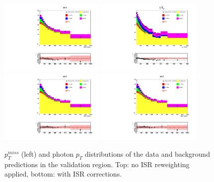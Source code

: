 \documentclass[thesis.tex]{subfiles}
\renewcommand\_{\textunderscore\allowbreak}
\begin{document}
\begin{figure}
  \centering
    \includegraphics[width=0.45\textwidth]{Figures/VALIDNOCOR_mg_2016ReMiniAOD_met.pdf}
    \includegraphics[width=0.45\textwidth]{Figures/VALIDNOCOR_mg_2016ReMiniAOD_pt.pdf} \\
    \includegraphics[width=0.45\textwidth]{Figures/VALID_mg_2016ReMiniAOD_met.pdf}
    \includegraphics[width=0.45\textwidth]{Figures/VALID_mg_2016ReMiniAOD_met.pdf}
  \caption{$p_T^{miss}$ (left) and photon $p_T$ distributions of the data and background predictions in the validation region. Top: no ISR reweighting applied, bottom: with ISR corrections. }
  \label{fig:apen-withcorr}
\end{figure}
\end{document}
